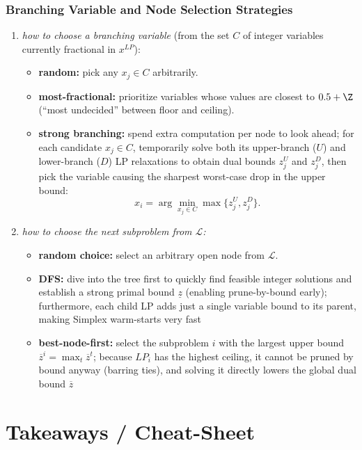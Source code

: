 \documentclass[a4paper, 11pt]{report}
\begin{document}
\subsubsection{Branching Variable and Node Selection Strategies}
\begin{enumerate}
    \item \textit{how to choose a branching variable} (from the set $C$ of integer variables currently fractional in $x^{LP}$):
    \begin{itemize}
        \item \textbf{random:} pick any $x_j \in C$ arbitrarily.
        \item \textbf{most-fractional:} prioritize variables whose values are closest to $0.5 + \Z$ (``most undecided'' between floor and ceiling).
        \item \textbf{strong branching:} spend extra computation per node to look ahead; for each candidate $x_j \in C$, temporarily solve both its upper-branch ($U$) and lower-branch ($D$) LP relaxations to obtain dual bounds $z_j^U$ and $z_j^D$, then pick the variable causing the sharpest worst-case drop in the upper bound:
        $$ x_i = \arg\min_{x_j \in C} \max \{ z_j^U, z_j^D \}. $$
    \end{itemize}

    \item \textit{how to choose the next subproblem from $\mathcal{L}$:}
    \begin{itemize}
        \item \textbf{random choice:} select an arbitrary open node from $\mathcal{L}$.
        \item \textbf{DFS:} dive into the tree first to quickly find feasible integer solutions and establish a strong primal bound $\underline{z}$ (enabling prune-by-bound early); furthermore, each child LP adds just a single variable bound to its parent, making Simplex warm-starts very fast
        \item \textbf{best-node-first:} select the subproblem $i$ with the largest upper bound $\overline{z}^i = \max_t \overline{z}^t$; because $LP_i$ has the highest ceiling, it cannot be pruned by bound anyway (barring ties), and solving it directly lowers the global dual bound $\overline{z}$
    \end{itemize}
\end{enumerate}

\section{Takeaways / Cheat-Sheet}
\end{document}
